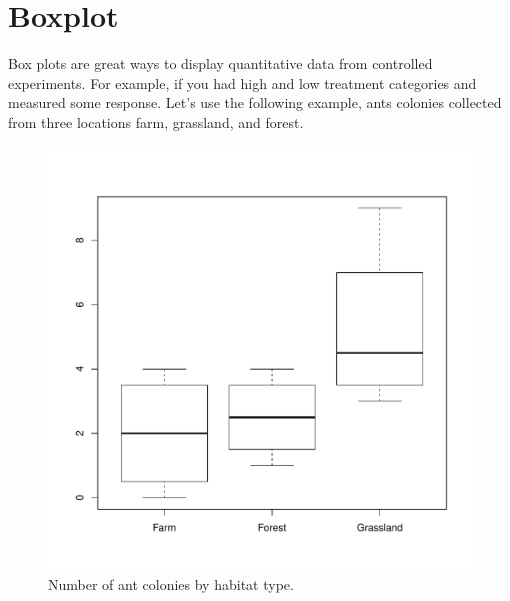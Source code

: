 \documentclass{article}\usepackage[]{graphicx}\usepackage[]{color}
\makeatletter
\def\maxwidth{ %
  \ifdim\Gin@nat@width>\linewidth
    \linewidth
  \else
    \Gin@nat@width
  \fi
}
\newenvironment{knitrout}{}{} %
\makeatother
\begin{document}
\section{Boxplot}

Box plots are great ways to display quantitative data from controlled experiments. For example, if you had high and low treatment categories and measured some response. Let's use the following example, ants colonies collected from three locations farm, grassland, and forest. 

\begin{knitrout}
\color{fgcolor}\begin{figure}
\includegraphics[width=\maxwidth]{figure/unnamed-chunk-7-1} \caption[Number of ant colonies by habitat type]{Number of ant colonies by habitat type.}\label{fig:unnamed-chunk-7}
\end{figure}


\end{knitrout}
\end{document}
